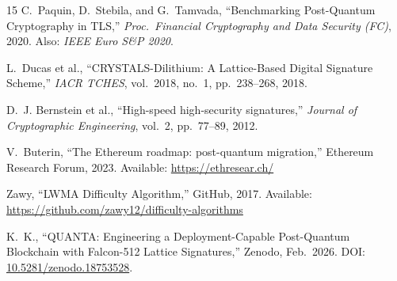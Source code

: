 \documentclass[11pt,a4paper]{article}
\begin{document}
\begin{thebibliography}{15}
C.~Paquin, D.~Stebila, and G.~Tamvada,
``Benchmarking Post-Quantum Cryptography in TLS,''
\textit{Proc.\ Financial Cryptography and Data Security (FC)}, 2020.
Also: \textit{IEEE Euro S\&P 2020}.

L.~Ducas et al.,
``CRYSTALS-Dilithium: A Lattice-Based Digital Signature Scheme,''
\textit{IACR TCHES}, vol.~2018, no.~1, pp.~238--268, 2018.

D.~J. Bernstein et al.,
``High-speed high-security signatures,''
\textit{Journal of Cryptographic Engineering}, vol.~2, pp.~77--89, 2012.

V.~Buterin,
``The Ethereum roadmap: post-quantum migration,''
Ethereum Research Forum, 2023.
Available: \url{https://ethresear.ch/}

Zawy,
``LWMA Difficulty Algorithm,''
GitHub, 2017.
Available: \url{https://github.com/zawy12/difficulty-algorithms}

K.~K.,
``QUANTA: Engineering a Deployment-Capable Post-Quantum Blockchain
with Falcon-512 Lattice Signatures,''
Zenodo, Feb.\ 2026.
DOI: \href{https://doi.org/10.5281/zenodo.18753528}{10.5281/zenodo.18753528}.

\end{thebibliography}
\end{document}
